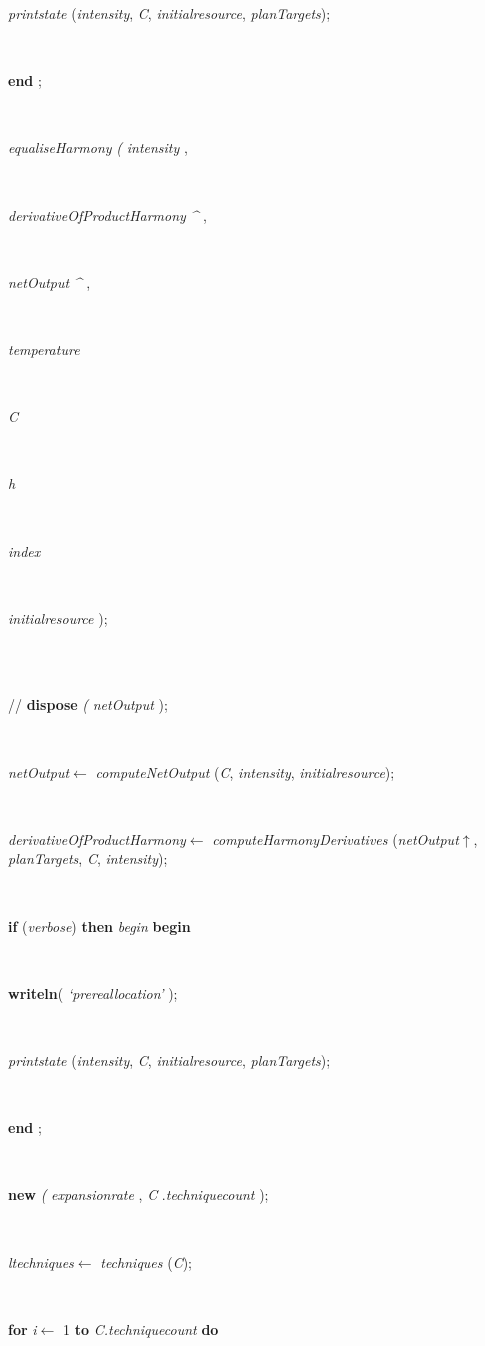 \begin{tabbing}
\parbox{14cm}{\textsf{\textit{printstate} (\textit{intensity}, \textit{C}, \textit{initialresource}, \textit{planTargets})}; }\\
\<\-\parbox{14cm}{\textsf{\textbf{end} ;}}\\
\parbox{14cm}{\textsf{\textit{equaliseHarmony} \textit{(}   \textit{intensity} ,}}\\
\parbox{14cm}{\textsf{\textit{derivativeOfProductHarmony} \textit{\^{}} ,}}\\
\parbox{14cm}{\textsf{\textit{netOutput} \textit{\^{}} ,}}\\
\parbox{14cm}{\textsf{\textit{temperature}}}\\
\parbox{14cm}{\textsf{\textit{C}}}\\
\parbox{14cm}{\textsf{\textit{h}}}\\
\parbox{14cm}{\textsf{\textit{index}}}\\
\parbox{14cm}{\textsf{\textit{initialresource}  );}}\\
\\
\parbox{14cm}{\textsf{//    \textbf{dispose} \textit{(} \textit{netOutput} );}}\\
\parbox{14cm}{\textsf{\textit{netOutput}$\leftarrow$ \textit{computeNetOutput} (\textit{C}, \textit{intensity}, \textit{initialresource})}; }\\
\parbox{14cm}{\textsf{\textit{derivativeOfProductHarmony}$\leftarrow$ \textit{computeHarmonyDerivatives} (\textit{netOutput}$\uparrow$\textit{}, \textit{planTargets}, \textit{C}, \textit{intensity})}; }\\
\+\<\parbox{14cm}{\textsf {\textbf {if } \textsf{(\textit{verbose})} \textbf{ then } \textsf{\textit{begin}} \textbf{ begin } }}\\
\parbox{14cm}{\textsf{\textbf{writeln}(\textit{\textrm{\textup { `prereallocation' } }})}; }\\
\parbox{14cm}{\textsf{\textit{printstate} (\textit{intensity}, \textit{C}, \textit{initialresource}, \textit{planTargets})}; }\\
\<\-\parbox{14cm}{\textsf{\textbf{end} ;}}\\
\parbox{14cm}{\textsf{\textbf{new} \textit{(} \textit{expansionrate} ,  \textit{C} .\textit{techniquecount} );}}\\
\parbox{14cm}{\textsf{\textit{ltechniques}$\leftarrow$ \textit{techniques} (\textit{C})}; }\\
\+\parbox{14cm}{\textsf {\textbf {for } \textsf{\textit{i}$\leftarrow$ 1} \textbf{ to } \textsf{\textit{C.techniquecount}} \textbf{ do } }}\\

\end{tabbing}
